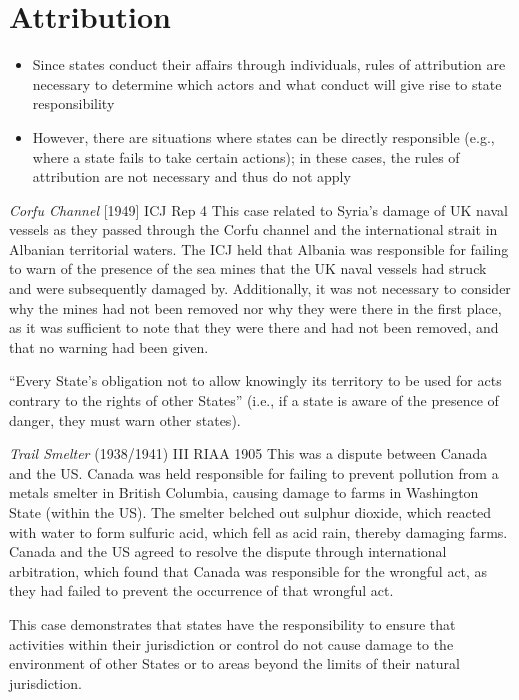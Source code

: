 \section{Attribution}
\begin{itemize}
    \item Since states conduct their affairs through individuals, rules of attribution are necessary to determine which actors and what conduct will give rise to state responsibility
    \item However, there are situations where states can be directly responsible (e.g., where a state fails to take certain actions); in these cases, the rules of attribution are not necessary and thus do not apply
\end{itemize}

\begin{casedetails}{\textit{Corfu Channel} [1949] ICJ Rep 4}
    \flushleft
    This case related to Syria's damage of UK naval vessels as they passed through the Corfu channel and the international strait in Albanian territorial waters. The ICJ held that Albania was responsible for failing to warn of the presence of the sea mines that the UK naval vessels had struck and were subsequently damaged by. Additionally, it was not necessary to consider why the mines had not been removed nor why they were there in the first place, as it was sufficient to note that they were there and had not been removed, and that no warning had been given.

    \vspace{\baselineskip}

    ``Every State's obligation not to allow knowingly its territory to be used for acts contrary to the rights of other States'' (i.e., if a state is aware of the presence of danger, they must warn other states).
\end{casedetails}

\begin{casedetails}{\textit{Trail Smelter} (1938/1941) III RIAA 1905}
    \flushleft
    This was a dispute between Canada and the US. Canada was held responsible for failing to prevent pollution from a metals smelter in British Columbia, causing damage to farms in Washington State (within the US). The smelter belched out sulphur dioxide, which reacted with water to form sulfuric acid, which fell as acid rain, thereby damaging farms. Canada and the US agreed to resolve the dispute through international arbitration, which found that Canada was responsible for the wrongful act, as they had failed to prevent the occurrence of that wrongful act.

    \vspace{\baselineskip}

    This case demonstrates that states have the responsibility to ensure that activities within their jurisdiction or control do not cause damage to the environment of other States or to areas beyond the limits of their natural jurisdiction.
\end{casedetails}

